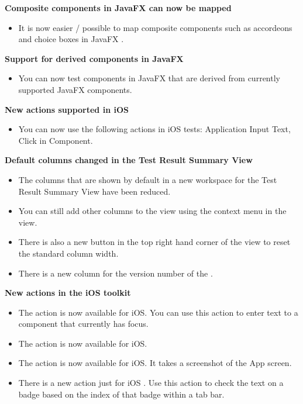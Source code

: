 \textbf{Composite components in JavaFX can now be mapped}
\begin{itemize}
\item It is now easier / possible to map composite components such as accordeons and choice boxes in JavaFX \gdauts{}. 
\end{itemize}

\textbf{Support for derived components in JavaFX}
\begin{itemize}
\item You can now test components in JavaFX \gdauts{} that are derived from currently supported JavaFX components. 
\end{itemize}

\textbf{New actions supported in iOS}
\begin{itemize}
\item You can now use the following actions in iOS tests: Application Input Text, Click in Component.
\end{itemize}

\textbf{Default columns changed in the Test Result Summary View}
\begin{itemize}
\item The columns that are shown by default in a new workspace for the Test Result Summary View have been reduced.
\item You can still add other columns to the view using the context menu in the view.
\item There is also a new button in the top right hand corner of the view to reset the standard column width.
\item There is a new column for the version number of the \gdproject{}.
\end{itemize}

\textbf{New actions in the iOS toolkit}
\begin{itemize}
\item The action  is now available for iOS. You can use this action to enter text to a component that currently has focus.
\item The action  is now available for iOS.
\item The action  is now available for iOS. It takes a screenshot of the App screen.
\item There is a new action just for iOS . Use this action to check the text on a badge based on the index of that badge within a tab bar. 
\end{itemize}

